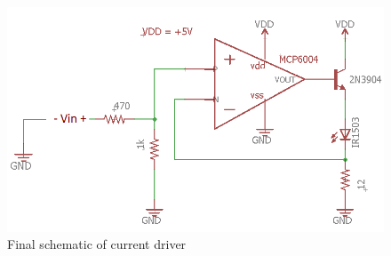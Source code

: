 
\begin{figure}[H]
	\centering
	\includegraphics[width=0.7\linewidth]{ExperimentalImplementation/LEDDriverExperimentalSchem}
	\caption{Final schematic of current driver}
	\label{fig:leddriverexperimentalschem}
\end{figure}

